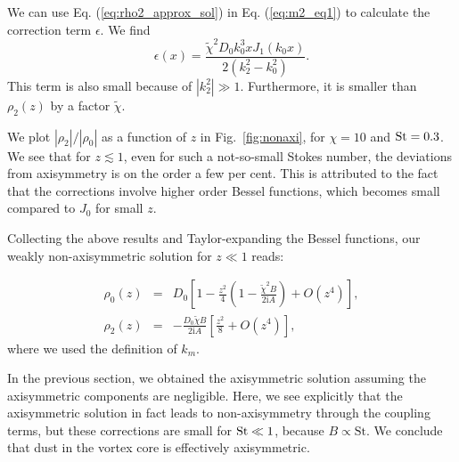 \documentclass[apj]{emulateapj}
\newcommand{\Eq}[1]{Eq. (\ref{#1})}
\newcommand{\eq}[1]{\Eq{#1}}
\newcommand{\Fig}[1]{Fig.~\ref{#1}}
\newcommand{\fig}[1]{\Fig{#1}}
\newcommand{\beq}{\begin{equation}}
\newcommand{\eeq}{\end{equation}}
\newcommand{\beqn}{\begin{eqnarray}}
\newcommand{\eeqn}{\end{eqnarray}}
\begin{document}
 
We can use \eq{eq:rho2_approx_sol} in \eq{eq:m2_eq1} to
calculate the correction term $\epsilon$. We find 
\beq
\epsilon(x) = \frac{\tilde{\chi}^2D_0k_0^3xJ_1(k_0x)}{2\left(k_2^2 -
  k_0^2\right)}. 
\eeq
This term is also small because of $|k_2^2|\gg1$. Furthermore, it is
smaller than $\rho_2(z)$ by a factor $\tilde{\chi}$.  

We plot $|\rho_2|/|\rho_0|$ as a function of $z$ in \fig{fig:nonaxi}, 
for $\chi=10$ and $\rm{St}=0.3$. We see that for $z\lesssim 1$, even 
for such a not-so-small Stokes number, the deviations from axisymmetry
is on the order a few per cent. This is attributed to the fact
that the corrections involve higher order Bessel functions, which
becomes small compared to $J_0$ for small $z$.   

Collecting the above results and Taylor-expanding the Bessel functions, our
weakly non-axisymmetric solution for $z\ll 1$ reads:


\beqn
\rho_0(z) &=& D_0\left[1 -
  \frac{z^2}{4}\left(1-\frac{\tilde{\chi}^2B}{2\mathrm{i}A}\right)
+ O(z^4)\right],\\
\rho_2(z) &=&
-\frac{D_0\tilde{\chi}B}{2\mathrm{i}A}\left[\frac{z^2}{8}+O(z^4)\right],  
\eeqn 
where we used the definition of $k_m$. 

In the previous section, we obtained the axisymmetric solution
assuming the axisymmetric components are negligible. Here, we 
see explicitly that the axisymmetric solution in fact leads to
non-axisymmetry through the coupling terms, but these corrections are
small for $\rm{St}\ll1$, because $B\propto\mathrm{St}$. 
We conclude that dust in the vortex core is effectively axisymmetric.   
\end{document}
